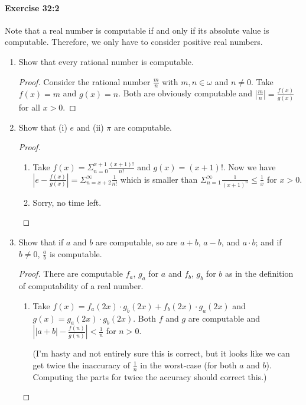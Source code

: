 \documentclass[a4paper,11pt]{article}
\begin{document}
\paragraph{Exercise 32:2}

Note that a real number is computable if and only if its absolute value is
computable. Therefore, we only have to consider positive real numbers.

\begin{enumerate}[label=(\alph*)]

\item
Show that every rational number is computable.

\begin{proof}
Consider the rational number $\frac{m}{n}$ with $m, n \in \omega$ and $n \neq 0$.
Take $f(x) = m$ and $g(x) = n$.
Both are obviously computable and $|\frac{m}{n}| = \frac{f(x)}{g(x)}$ for all $x > 0$.
\end{proof}

\item
Show that (i) $e$ and (ii) $\pi$ are computable.

\begin{proof}
\begin{enumerate}[label=(\roman*)]
\item Take $f(x) = \Sigma_{n=0}^{x+1} \frac{(x+1)!}{n!}$ and $g(x) = (x+1)!$.
Now we have $|e - \frac{f(x)}{g(x)}| = \Sigma_{n=x+2}^\infty \frac{1}{n!}$
which is smaller than $\Sigma_{n=1}^\infty \frac{1}{(x+1)^n} \leq \frac{1}{x}$ for $x > 0$.
\item Sorry, no time left.\qedhere
\end{enumerate}
\end{proof}

\item
Show that if $a$ and $b$ are computable, so are $a + b$, $a - b$, and $a \cdot b$; and if $b \neq 0$,
$\frac{a}{b}$ is computable.

\begin{proof}
There are computable $f_a$, $g_a$ for $a$ and $f_b$, $g_b$ for $b$ as in the definition of
computability of a real number.

\begin{enumerate}[label=(\roman*)]
\item
Take $f(x) = f_a(2x) \cdot g_b(2x) + f_b(2x) \cdot g_a(2x)$ and $g(x) = g_a(2x) \cdot g_b(2x)$.
Both $f$ and $g$ are computable and $\left|\left|a+b\right| - \frac{f(n)}{g(n)}\right| < \frac{1}{n}$ for $n > 0$.

(I'm hasty and not entirely sure this is correct, but it looks like we can get twice the inaccuracy
of $\frac{1}{n}$ in the worst-case (for both $a$ and $b$). Computing the parts for twice the
accuracy should correct this.)


\end{enumerate}
\end{proof}
\end{enumerate}
\end{document}
